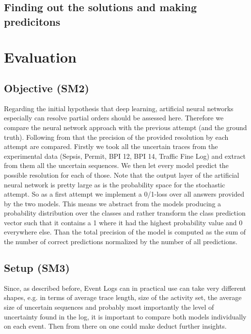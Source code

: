 \documentclass[
	a4paper,
	pagesize,
	pdftex,
	12pt,
	ngerman,
	fleqn,
	final,
	]{scrartcl}
\theoremstyle{plain}
\theoremstyle{definition}
\begin{document}
	\subsection{Finding out the solutions and making predicitons}

\section{Evaluation}

	\subsection{Objective (SM2)}
	Regarding the initial hypothesis that deep learning, artificial neural networks especially can resolve partial orders should be assessed here. Therefore we compare the neural network approach with the previous attempt \cite{self} (and the ground truth). Following from that the precision of the provided resolution by each attempt are compared. Firstly we took all the uncertain traces from the experimental data (Sepsis, Permit, BPI 12, BPI 14, Traffic Fine Log) and extract from them all the uncertain sequences. We then let every model predict the possible resolution for each of those. Note that the output layer of the artificial neural network is pretty large as is the probability space for the stochastic attempt. So as a first attempt we implement a 0/1-loss over all answers provided by the two models. This means we abstract from the models producing a probability distribution over the classes and rather transform the class prediction vector such that it contains a 1 where it had the highest probability value and 0 everywhere else. Than the total precision of the model is computed as the sum of the number of correct predictions normalized by the number of all predictions.\\
	
	\subsection{Setup (SM3)}
	Since, as described before, Event Logs can in practical use can take very different shapes, e.g. in terms of average trace length, size of the activity set, the average size of uncertain sequences and probably most importantly the level of uncertainty found in the log, it is important to compare both models individually on each event. Then from there on one could make deduct further insights. 
	
\end{document}
